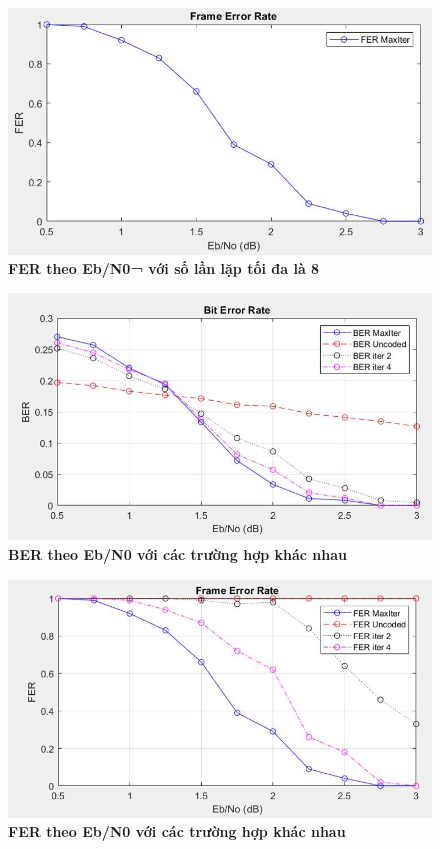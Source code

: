 \documentclass{article}
\begin{document}
\begin{figure}[H]
    \centering
    \includegraphics[width=12cm]{images/FER.JPG}
    \caption[FER theo Eb/N0¬ với số lần lặp tối đa là 8]{\bfseries\fontsize{12pt}{0pt} \selectfont FER theo Eb/N0¬ với số lần lặp tối đa là 8} %
    \label{hinh25}
\end{figure}
\begin{figure}[H]
    \centering
    \includegraphics[width=12cm]{images/BER2.JPG}
    \caption[BER theo Eb/N0 với các trường hợp khác nhau]{\bfseries\fontsize{12pt}{0pt} \selectfont BER theo Eb/N0 với các trường hợp khác nhau} %
    \label{hinh26}
\end{figure}
\begin{figure}[H]
    \centering
    \includegraphics[width=12cm]{images/FER2.JPG}
    \caption[FER theo Eb/N0 với các trường hợp khác nhau]{\bfseries\fontsize{12pt}{0pt} \selectfont FER theo Eb/N0 với các trường hợp khác nhau} %
    \label{hinh27}
\end{figure}
\end{document}

